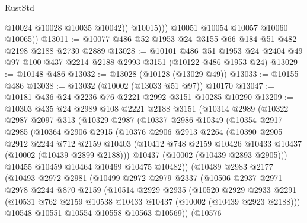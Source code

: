 \begin{lexlean}{RustStd}
\begin{coremodule}
                  @10024
                  @10028
                  @10035
                  @10042))
              @10015)))
        @10051
        @10054
        @10057
        @10060
        @10065))
@13011 := @10077 @486 @52 @1953 @24 @3155 @66 @184 @51 @482 @2198 @2188 @2730 @2889
@13028 := @10101
    @486
    @51
    @1953
    @24
    @2404
    @49
    @97
    @100
    @437
    @2214
    @2188
    @2993
    @3151
    (@10122 @486 @1953 @24)
@13029 := @10148 @486
@13032 := @13028 (@10128 (@13029 @49))
@13033 := @10155 @486
@13038 := @13032 (@10002 (@13033 @51 @97)) @10170
@13047 := @10181 @436 @24 @2236 @76 @2221 @2992 @3151 @10285 @10290
@13209 := @10303
    @435
    @24
    @2989
    @108
    @2221
    @2188
    @3151
    (@10314
      @2989
      (@10322
        @2987
        @2097
        @313
        (@10329
          @2987
          (@10337
            @2986
            @10349
            (@10354
              @2917
              @2985
              (@10364
                @2906
                @2915
                (@10376
                  @2906
                  @2913
                  @2264
                  (@10390
                    @2905
                    @2912
                    @2244
                    @712
                    @2159
                    @10403
                    (@10412 @748 @2159 @10426 @10433 @10437 (@10002 (@10439 @2899 @2188)))
                    @10437
                    (@10002 (@10439 @2893 @2905)))
                  @10455
                  @10459
                  @10464
                  @10469
                  @10475
                  @10482))
              (@10489
                @2983
                @2177
                (@10493
                  @2972
                  @2981
                  (@10499
                    @2972
                    @2979
                    @2337
                    (@10506
                      @2937
                      @2971
                      @2978
                      @2244
                      @870
                      @2159
                      (@10514
                        @2929
                        @2935
                        (@10520
                          @2929
                          @2933
                          @2291
                          (@10531 @762 @2159 @10538 @10433 @10437 (@10002 (@10439 @2923 @2188)))
                          @10548
                          @10551
                          @10554
                          @10558
                          @10563
                          @10569))
                      (@10576

\end{coremodule}
\end{lexlean}
